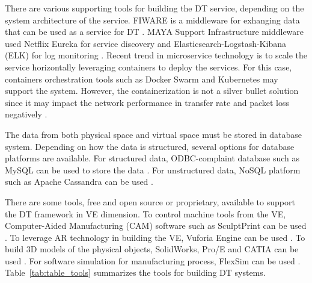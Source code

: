 \documentclass[article,table]{aaltoseries}
\begin{document}
There are various supporting tools for building the DT service, depending on the system architecture of the service. FIWARE is a middleware for exhanging data that can be used as a service for DT \cite{Schroeder2016automationml}. MAYA Support Infrastructure middleware used Netflix Eureka for service discovery and Elasticsearch-Logstash-Kibana (ELK) for log monitoring \cite{ciavotta2017microservice}. Recent trend in microservice technology is to scale the service horizontally leveraging containers to deploy the services. For this case, containers orchestration tools such as Docker Swarm and Kubernetes may support the system. However, the containerization is not a silver bullet solution since it may impact the network performance in transfer rate and packet loss negatively \cite{kratzke2017microservices}.

The data from both physical space and virtual space must be stored in database system. Depending on how the data is structured, several options for database platforms are available. For structured data, ODBC-complaint database such as MySQL can be used to store the data \cite{Zhang2017}. For unstructured data, NoSQL platform such as Apache Cassandra can be used \cite{ciavotta2017microservice}.

There are some tools, free and open source or proprietary, available to support the DT framework in VE dimension. To control machine tools from the VE, Computer-Aided Manufacturing (CAM) software such as SculptPrint can be used \cite{lynn2018realization}. To leverage AR technology in building the VE, Vuforia Engine can be used \cite{schroeder2016visualising}. To build 3D models of the physical objects, SolidWorks, Pro/E and CATIA can be used \cite{Zhuang2018}. For software simulation for manufacturing process, FlexSim can be used \cite{Zhang2017}. Table~\ref{tab:table_tools} summarizes the tools for building DT systems.
\end{document}
